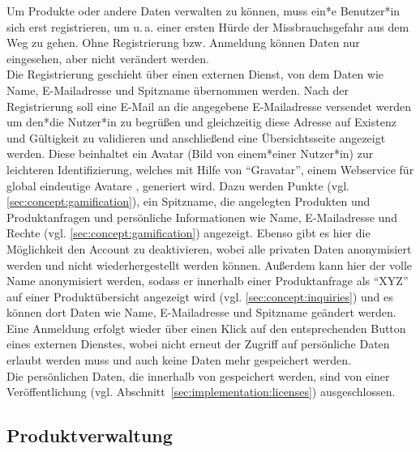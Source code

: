 Um Produkte oder andere Daten verwalten zu können, muss ein*e
Benutzer*in sich erst registrieren, um u.\,a. einer ersten Hürde der
Missbrauchsgefahr aus dem Weg zu gehen.
Ohne Registrierung bzw. Anmeldung können Daten nur eingesehen, aber
nicht verändert werden.\\
Die Registrierung geschieht über einen externen Dienst, von dem Daten wie Name, 
E-Mail\-adresse und Spitzname übernommen werden.
Nach der Registrierung soll eine E-Mail an die angegebene E-Mailadresse 
versendet werden um den*die Nutzer*in zu begrüßen und gleichzeitig diese Adresse 
auf Existenz und Gültigkeit zu validieren und anschließend eine Übersichtsseite 
angezeigt werden.
Diese beinhaltet ein Avatar (Bild von einem*einer Nutzer*in) zur leichteren 
Identifizierung,
welches mit Hilfe von "`Gravatar"', einem Webservice für global
eindeutige Avatare , generiert wird. Dazu werden Punkte
(vgl. \ref{sec:concept:gamification}), ein Spitzname, die angelegten Produkten 
und 
Produktanfragen
und persönliche Informationen wie Name, E-Mailadresse und Rechte
(vgl. \ref{sec:concept:gamification}) angezeigt.
Ebenso gibt es hier die Möglichkeit den Account zu deaktivieren, wobei
alle privaten Daten anonymisiert werden und nicht wiederhergestellt
werden können. Außerdem kann hier der volle Name anonymisiert werden, sodass er 
innerhalb einer Produktanfrage als "`XYZ"' auf einer Produktübersicht angezeigt 
wird (vgl. \ref{sec:concept:inquiries}) und es können dort Daten wie Name, 
E-Mailadresse und Spitzname geändert werden.\\
Eine Anmeldung erfolgt wieder über einen Klick auf den entsprechenden Button
eines externen Dienstes, wobei nicht erneut der Zugriff auf
persönliche Daten erlaubt werden muss und auch keine Daten mehr
gespeichert werden.\\
Die persönlichen Daten, die innerhalb von \name gespeichert werden, sind von 
einer Veröffentlichung (vgl. Abschnitt~\ref{sec:implementation:licenses}) ausgeschlossen.

\subsection{Produktverwaltung}
\label{sec:concept:product}

